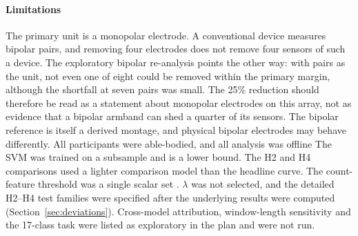 \paragraph{Limitations}
The primary unit is a monopolar electrode. A conventional device measures bipolar pairs, and removing four electrodes does not remove four sensors of such a device. The exploratory bipolar re-analysis points the other way: with pairs as the unit, not even one of eight could be removed within the primary margin, although the shortfall at seven pairs was small. The 25\% reduction should therefore be read as a statement about monopolar electrodes on this array, not as evidence that a bipolar armband can shed a quarter of its sensors. The bipolar reference is itself a derived montage, and physical bipolar electrodes may behave differently. All participants were able-bodied, and all analysis was offline The SVM was trained on a subsample and is  a lower bound. The H2 and H4 comparisons used a lighter comparison model than the headline curve. The count-feature threshold was a single scalar set . $\lambda$ was not selected, and the detailed H2--H4 test families were specified after the underlying results were computed (Section~\ref{sec:deviations}).  Cross-model attribution, window-length sensitivity and the 17-class task were listed as exploratory in the plan and were not run.
